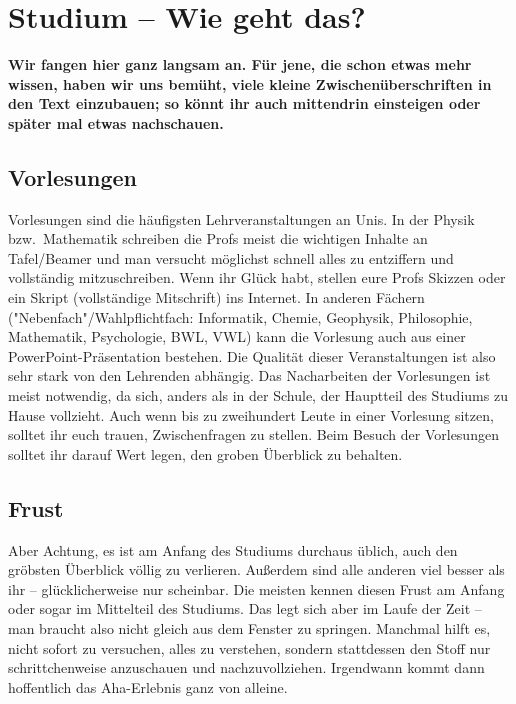 \section{Studium -- Wie geht das?}
\begin{multicols}{2}
\fibelspacingsubsubsection[subsection]

\textbf{Wir fangen hier ganz langsam an.
Für jene, die schon etwas mehr wissen, haben wir uns bemüht, viele kleine Zwischenüberschriften in den Text einzubauen; so könnt ihr auch mittendrin einsteigen oder später mal etwas nachschauen.}

\subsection{Vorlesungen}
Vorlesungen sind die häufigsten Lehrveranstaltungen an Unis.
In der Physik bzw.\ Mathematik schreiben die Profs meist die wichtigen Inhalte an Tafel/Beamer und man versucht möglichst schnell alles zu entziffern und vollständig mitzuschreiben.
Wenn ihr Glück habt, stellen eure Profs Skizzen oder ein Skript (vollständige Mitschrift) ins Internet.
In anderen Fächern ("Nebenfach"/Wahlpflichtfach: Informatik, Chemie, Geophysik, Philosophie, Mathematik, Psychologie, BWL, VWL) kann die Vorlesung auch aus einer PowerPoint-Präsentation bestehen.
Die Qualität dieser Veranstaltungen ist also sehr stark von den Lehrenden abhängig.
Das Nacharbeiten der Vorlesungen ist meist notwendig, da sich, anders als in der Schule, der Hauptteil des Studiums zu Hause vollzieht.
Auch wenn bis zu zweihundert Leute in einer Vorlesung sitzen, solltet ihr euch trauen, Zwischenfragen zu stellen.
Beim Besuch der Vorlesungen solltet ihr darauf Wert legen, den groben Überblick zu behalten.

\subsection{Frust}
Aber Achtung, es ist am Anfang des Studiums durchaus üblich, auch den gröbsten Überblick völlig zu verlieren.
Außerdem sind alle anderen viel besser als ihr -- glücklicherweise nur scheinbar.
Die meisten kennen diesen Frust am Anfang oder sogar im Mittelteil des Studiums.
Das legt sich aber im Laufe der Zeit -- man braucht also nicht gleich aus dem Fenster zu springen.
Manchmal hilft es, nicht sofort zu versuchen, alles zu verstehen, sondern stattdessen den Stoff nur schrittchenweise anzuschauen und nachzuvollziehen.
Irgendwann kommt dann hoffentlich das Aha-Erlebnis ganz von alleine.


\end{multicols}
